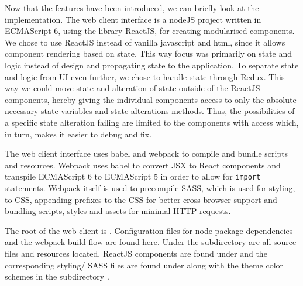 Now that the features have been introduced, we can briefly look at the implementation.
The web client interface is a nodeJS project written in ECMAScript 6, using the library ReactJS, for creating modularised components.
We chose to use ReactJS instead of vanilla javascript and html, since it allows component rendering based on state.
This way focus was primarily on state and logic instead of design and propagating state to the application.
To separate state and logic from UI even further, we chose to handle state through Redux.
This way we could move state and alteration of state outside of the ReactJS components, hereby giving the individual components access to only the absolute necessary state variables and state alterations methods. Thus, the possibilities of a specific state alteration failing are limited to the components with access which, in turn, makes it easier to debug and fix.

The web client interface uses babel and webpack to compile and bundle scripts and resources.
Webpack uses babel to convert JSX to React components and transpile ECMAScript 6 to ECMAScript 5 in order to allow for \texttt{import} statements.
Webpack itself is used to precompile SASS, which is used for styling, to CSS, appending prefixes to the CSS for better cross-browser support and bundling scripts, styles and assets for minimal HTTP requests.

The root of the web client is . Configuration files for node package dependencies and the webpack build flow are found here.
Under the subdirectory  are all source files and resources located.
ReactJS components are found under  and the corresponding styling/ SASS files are found under  along with the theme color schemes in the subdirectory .

